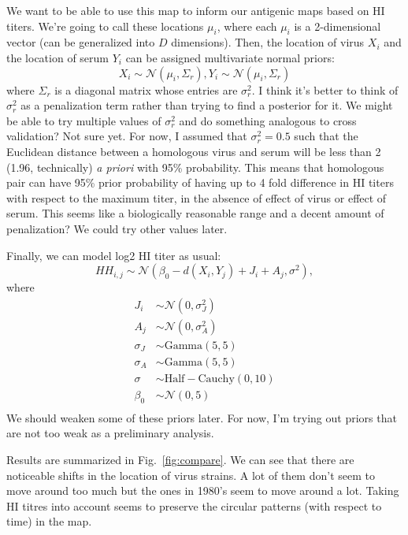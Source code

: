 \documentclass[12pt]{article}
\newcommand{\fref}[1]{Fig.~\ref{fig:#1}}
\begin{document}
We want to be able to use this map to inform our antigenic maps based on HI titers. We're going to call these locations $\mu_i$, where each $\mu_i$ is a 2-dimensional vector (can be generalized into $D$ dimensions).
Then, the location of virus $X_i$ and the location of serum $Y_i$ can be assigned multivariate normal priors:
\begin{equation}
X_i \sim \mathcal{N}(\mu_i, \Sigma_r), Y_i \sim \mathcal{N}(\mu_i, \Sigma_r)
\end{equation}
where $\Sigma_r$ is a diagonal matrix whose entries are $\sigma_r^2$.
I think it's better to think of $\sigma_r^2$ as a penalization term rather than trying to find a posterior for it. 
We might be able to try multiple values of $\sigma_r^2$ and do something analogous to cross validation? Not sure yet.
For now, I assumed that $\sigma_r^2 = 0.5$ such that the Euclidean distance between a homologous virus and serum will be less than 2 (1.96, technically) \textit{a priori} with 95\% probability. This means that homologous pair can have 95\% prior probability of having up to 4 fold difference in HI titers with respect to the maximum titer, in the absence of effect of virus or effect of serum.
This seems like a biologically reasonable range and a decent amount of penalization? We could try other values later.

Finally, we can model log2 HI titer as usual:
\begin{equation}
HH_{i,j} \sim \mathcal{N}\left(\beta_0 - d(X_i, Y_j) + J_i + A_j, \sigma^2\right),
\end{equation}
where 
\begin{equation}
\begin{aligned}
J_i &\sim \mathcal{N}(0, \sigma_J^2)\\
A_j &\sim \mathcal{N}(0, \sigma_A^2)\\
\sigma_J &\sim \mathrm{Gamma}(5, 5)\\
\sigma_A &\sim \mathrm{Gamma}(5, 5)\\
\sigma &\sim \mathrm{Half-Cauchy}(0, 10)\\
\beta_0 &\sim \mathcal{N}(0, 5)\\
\end{aligned}
\end{equation}
We should weaken some of these priors later. For now, I'm trying out priors that are not too weak as a preliminary analysis.

Results are summarized in \fref{compare}.
We can see that there are noticeable shifts in the location of virus strains. A lot of them don't seem to move around too much but the ones in 1980's seem to move around a lot.
Taking HI titres into account seems to preserve the circular patterns (with respect to time) in the map.
\end{document}
